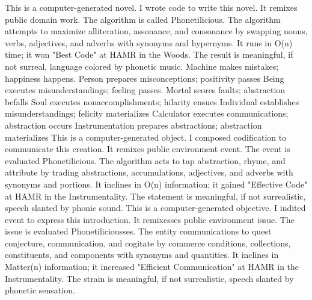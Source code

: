 \documentclass[12pt,a4paper,oneside]{book}
\begin{document}
\clearpage
This is a computer-generated novel. I wrote code to write this novel. It remixes public domain work. The algorithm is called Phonetilicious. The algorithm attempts to maximize alliteration, assonance, and consonance by swapping nouns, verbs, adjectives, and adverbs with synonyms and hypernyms. It runs in O(n) time; it won "Best Code" at HAMR in the Woods. The result is meaningful, if not surreal, language colored by phonetic music.\newline \newline
Machine makes mistakes; happiness happens. \newline \newline
Person prepares misconceptions;  positivity passes \newline \newline
Being executes misunderstandings; feeling passes. \newline \newline 
Mortal scores faults; abstraction befalls \newline \newline
Soul executes nonaccomplishments; hilarity ensues \newline \newline 
Individual establishes misunderstandings; felicity materializes \newline \newline
Calculator executes communications; abstraction occurs \newline \newline
Instrumentation prepares abstractions; abstraction materializes \newline \newline
This is a computer-generated object. I composed codification to communicate this creation. It remixes public environment event. The event is evaluated Phonetilicious. The algorithm acts to tap abstraction, rhyme, and attribute by trading abstractions, accumulations, adjectives, and adverbs with synonyms and portions. It inclines in O(n) information; it gained "Effective Code" at HAMR in the Instrumentality. The statement is meaningful, if not surrealistic, speech slanted by phonic sound.\newline \newline
This is a computer-generated objective. I indited event to express this introduction. It remixesses public environment issue. The issue is evaluated Phonetiliciousses. The entity communications to quest conjecture, communication, and cogitate by commerce conditions, collections, constituents, and components with synonyms and quantities. It inclines in Matter(n) information; it increased "Efficient Communication" at HAMR in the Instrumentality. The strain is meaningful, if not surrealistic, speech slanted by phonetic sensation. 
\tableofcontents
\end{document}
